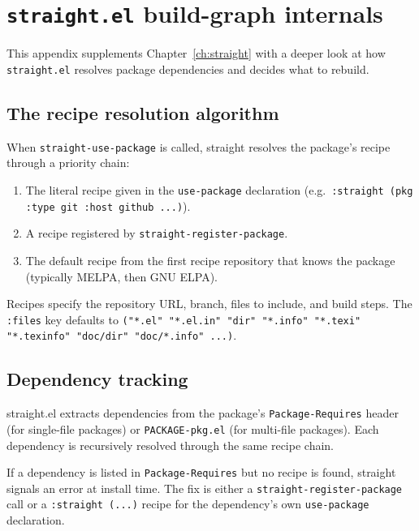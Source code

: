 \chapter{\texttt{straight.el} build-graph internals}
\label{app:straight-internals}

This appendix supplements Chapter~\ref{ch:straight} with a deeper
look at how \texttt{straight.el} resolves package dependencies and
decides what to rebuild.

\section{The recipe resolution algorithm}

When \texttt{straight-use-package} is called, straight resolves the
package's recipe through a priority chain:

\begin{enumerate}
  \item The literal recipe given in the \texttt{use-package}
    declaration (e.g.\ \texttt{:straight (pkg :type git :host github ...)}).
  \item A recipe registered by \texttt{straight-register-package}.
  \item The default recipe from the first recipe repository that
    knows the package (typically MELPA, then GNU ELPA).
\end{enumerate}

Recipes specify the repository URL, branch, files to include, and
build steps.  The \texttt{:files} key defaults to
\texttt{("*.el" "*.el.in" "dir" "*.info" "*.texi" "*.texinfo"
"doc/dir" "doc/*.info" ...)}.

\section{Dependency tracking}

straight.el extracts dependencies from the package's
\texttt{Package-Requires} header (for single-file packages) or
\texttt{PACKAGE-pkg.el} (for multi-file packages).  Each dependency
is recursively resolved through the same recipe chain.

If a dependency is listed in \texttt{Package-Requires} but no recipe
is found, straight signals an error at install time.  The fix is
either a \texttt{straight-register-package} call or a
\texttt{:straight (...)} recipe for the dependency's own
\texttt{use-package} declaration.

